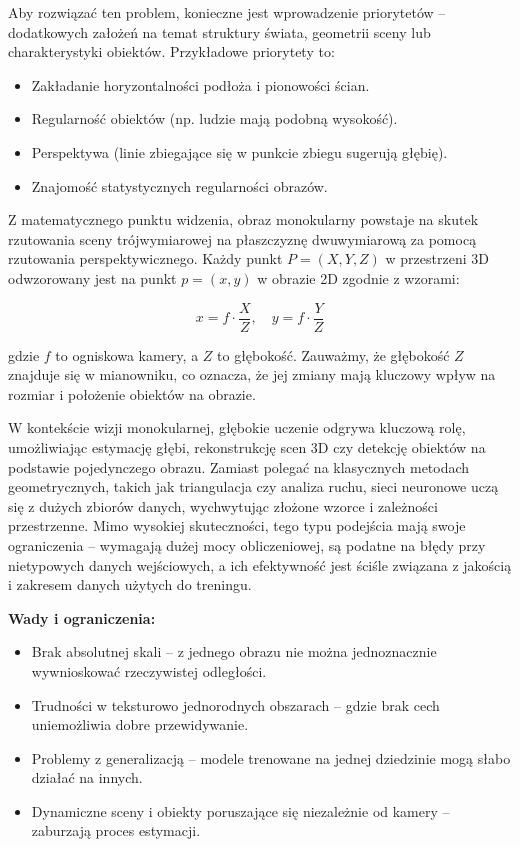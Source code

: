 \documentclass[magisterska]{pracadypl}
\begin{document}
Aby rozwiązać ten problem, konieczne jest wprowadzenie priorytetów – dodatkowych założeń na temat struktury świata, geometrii sceny lub charakterystyki obiektów. Przykładowe priorytety to:

\begin{itemize}
  \item Zakładanie horyzontalności podłoża i pionowości ścian.

  \item Regularność obiektów (np. ludzie mają podobną wysokość).

  \item Perspektywa (linie zbiegające się w punkcie zbiegu sugerują głębię).

  \item Znajomość statystycznych regularności obrazów.
\end{itemize}

Z matematycznego punktu widzenia, obraz monokularny powstaje na skutek rzutowania sceny trójwymiarowej na płaszczyznę dwuwymiarową za pomocą rzutowania perspektywicznego. Każdy punkt $P = (X,Y,Z)$ w przestrzeni 3D odwzorowany jest na punkt $p = (x,y)$ w obrazie 2D zgodnie z wzorami:

\[
x = f \cdot \frac{X}{Z}, \quad
y = f \cdot \frac{Y}{Z}
\]

gdzie $f$ to ogniskowa kamery, a $Z$ to głębokość. Zauważmy, że głębokość $Z$ znajduje się w mianowniku, co oznacza, że jej zmiany mają kluczowy wpływ na rozmiar i położenie obiektów na obrazie.

W kontekście wizji monokularnej, głębokie uczenie odgrywa kluczową rolę, umożliwiając estymację głębi, rekonstrukcję scen 3D czy detekcję obiektów na podstawie pojedynczego obrazu. Zamiast polegać na klasycznych metodach geometrycznych, takich jak triangulacja czy analiza ruchu, sieci neuronowe uczą się z dużych zbiorów danych, wychwytując złożone wzorce i zależności przestrzenne. Mimo wysokiej skuteczności, tego typu podejścia mają swoje ograniczenia – wymagają dużej mocy obliczeniowej, są podatne na błędy przy nietypowych danych wejściowych, a ich efektywność jest ściśle związana z jakością i zakresem danych użytych do treningu.

\begin{minipage}[t]{\textwidth}
\textbf{Wady i ograniczenia:}
\begin{itemize}
  \item Brak absolutnej skali – z jednego obrazu nie można jednoznacznie wywnioskować rzeczywistej odległości.

  \item Trudności w teksturowo jednorodnych obszarach – gdzie brak cech uniemożliwia dobre przewidywanie.

  \item Problemy z generalizacją – modele trenowane na jednej dziedzinie mogą słabo działać na innych.

  \item Dynamiczne sceny i obiekty poruszające się niezależnie od kamery – zaburzają proces estymacji.
\end{itemize}
\end{minipage}
\end{document}
